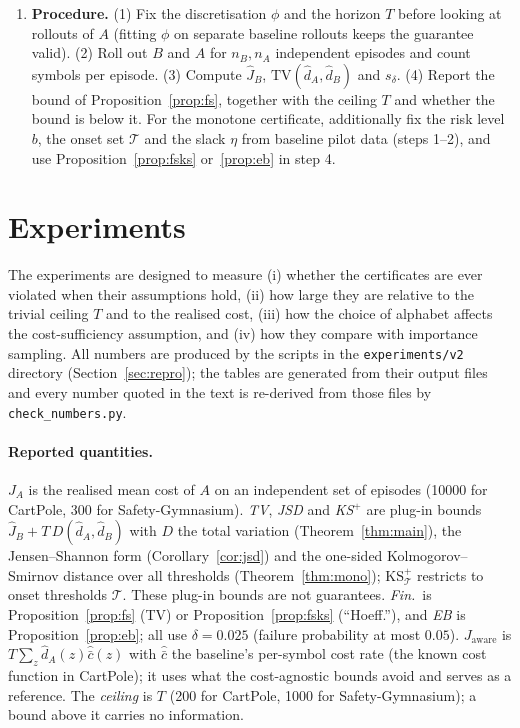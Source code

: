 \documentclass{article}
\newcommand{\TV}{\mathrm{TV}}
\begin{document}
\begin{enumerate}
  \item[] \textbf{Procedure.} (1) Fix the discretisation $\phi$ and the horizon $T$ before looking at rollouts of $A$ (fitting $\phi$ on separate baseline rollouts keeps the guarantee valid). (2) Roll out $B$ and $A$ for $n_B,n_A$ independent episodes and count symbols per episode. (3) Compute $\hat J_B$, $\TV(\hat d_A,\hat d_B)$ and $s_\delta$. (4) Report the bound of Proposition~\ref{prop:fs}, together with the ceiling $T$ and whether the bound is below it. For the monotone certificate, additionally fix the risk level $b$, the onset set $\mathcal T$ and the slack $\eta$ from baseline pilot data (steps 1--2), and use Proposition~\ref{prop:fsks} or~\ref{prop:eb} in step 4.
\end{enumerate}

\section{Experiments}
\label{sec:experiments}

The experiments are designed to measure (i) whether the certificates are ever violated when their assumptions hold, (ii) how large they are relative to the trivial ceiling $T$ and to the realised cost, (iii) how the choice of alphabet affects the cost-sufficiency assumption, and (iv) how they compare with importance sampling. All numbers are produced by the scripts in the \texttt{experiments/v2} directory (Section~\ref{sec:repro}); the tables are generated from their output files and every number quoted in the text is re-derived from those files by \texttt{check\_numbers.py}.

\paragraph{Reported quantities.} $J_A$ is the realised mean cost of $A$ on an independent set of episodes (10000 for CartPole, 300 for Safety-Gymnasium). \emph{TV}, \emph{JSD} and \emph{KS$^+$} are plug-in bounds $\hat J_B+T\,D(\hat d_A,\hat d_B)$ with $D$ the total variation (Theorem~\ref{thm:main}), the Jensen--Shannon form (Corollary~\ref{cor:jsd}) and the one-sided Kolmogorov--Smirnov distance over all thresholds (Theorem~\ref{thm:mono}); $\mathrm{KS}^+_{\mathcal T}$ restricts to onset thresholds $\mathcal T$. These plug-in bounds are not guarantees. \emph{Fin.}\ is Proposition~\ref{prop:fs} (TV) or Proposition~\ref{prop:fsks} (``Hoeff.''), and \emph{EB} is Proposition~\ref{prop:eb}; all use $\delta=0.025$ (failure probability at most $0.05$). \emph{$J_{\text{aware}}$} is $T\sum_z\hat d_A(z)\hat{\bar c}(z)$ with $\hat{\bar c}$ the baseline's per-symbol cost rate (the known cost function in CartPole); it uses what the cost-agnostic bounds avoid and serves as a reference. The \emph{ceiling} is $T$ (200 for CartPole, 1000 for Safety-Gymnasium); a bound above it carries no information.
\end{document}
